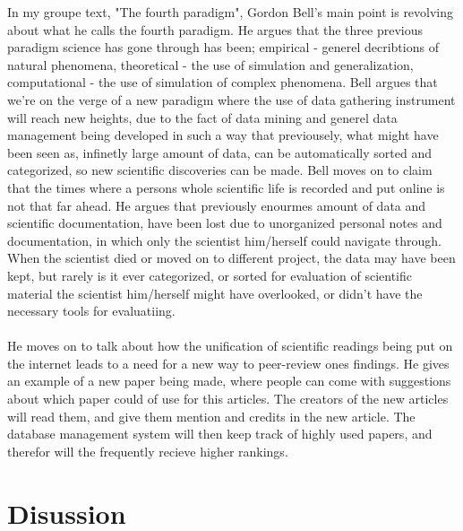 \documentclass[paper=a4, fontsize=11pt]{scrartcl} %
\numberwithin{equation}{section} %
\numberwithin{figure}{section} %
\numberwithin{table}{section} %
\begin{document}
	In my groupe text, "The fourth paradigm", Gordon Bell's main point is revolving about what he calls the fourth paradigm. He argues that the three previous paradigm science has gone through has been; empirical - generel decribtions of natural phenomena, theoretical - the use of simulation and generalization, computational - the use of simulation of complex phenomena. Bell argues that we're on the verge of a new paradigm where the use of data gathering instrument will reach new heights, due to the fact of data mining and generel data management being developed in such a way that previousely, what might have been seen as, infinetly large amount of data, can be automatically sorted and categorized, so new scientific discoveries can be made. Bell moves on to claim that the times where a persons whole scientific life is recorded and put online is not that far ahead. He argues that previously enourmes amount of data and scientific documentation, have been lost due to unorganized personal notes and documentation, in which only the scientist him/herself could navigate through. When the scientist died or moved on to different project, the data may have been kept, but rarely is it ever categorized, or sorted for evaluation of scientific material the scientist him/herself might have overlooked, or didn't have the necessary tools for evaluatiing. 
	\\ \\
	He moves on to talk about how the unification of scientific readings being put on the internet leads to a need for a new way to peer-review ones findings. He gives an example of a new paper being made, where people can come with suggestions about which paper could of use for this articles. The creators of the new articles will read them, and give them mention and credits in the new article. The database management system will then keep track of highly used papers, and therefor will the frequently recieve higher rankings.
	
	\section{Disussion}
	
\end{document}
